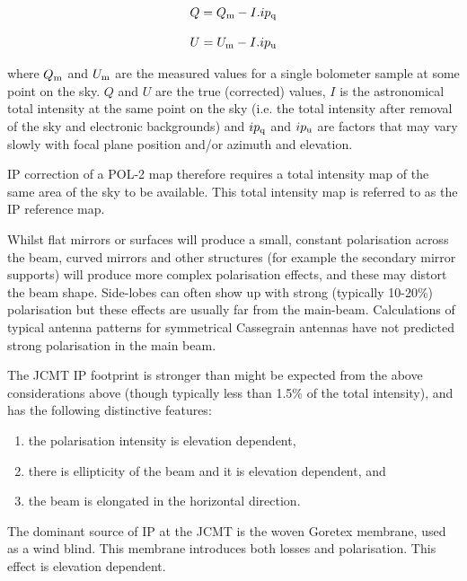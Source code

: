 \begin{equation}
Q = Q_{\textnormal{m}} - I. ip_{\textnormal{q}}
\end{equation}

\begin{equation}
U = U_{\textnormal{m}} - I. ip_{\textnormal{u}}
\end{equation}

where $Q_{\textnormal{m}}$ and $U_{\textnormal{m}}$ are the measured values for a single
bolometer sample at some point on the sky. $Q$ and $U$ are the true
(corrected) values, $I$ is the astronomical total intensity at the same
point on the sky (i.e. the total intensity after removal of the sky
and electronic backgrounds) and $ip_{\textnormal{q}}$ and $ip_{\textnormal{u}}$
are factors that may vary slowly with focal plane position and/or azimuth and
elevation.

IP correction of a POL-2 map therefore requires a total
intensity map of the same area of the sky to be available. This total
intensity map is referred to as the IP reference map.

Whilst flat mirrors or surfaces will produce a small, constant
polarisation across the beam, curved mirrors and other structures (for
example the secondary mirror supports) will produce more complex
polarisation effects, and these may distort the beam shape.
Side-lobes can often show up with strong (typically 10-20\%)
polarisation but these effects are usually far from the
main-beam. Calculations of typical antenna patterns for symmetrical
Cassegrain antennas have not predicted strong polarisation in the main
beam.

The JCMT IP footprint is stronger than might be expected from the
above considerations above (though typically less than 1.5\% of the
total intensity), and has the following distinctive features:

\begin{enumerate}
\item the polarisation intensity is elevation dependent,
\item there is ellipticity of the beam and it is elevation dependent, and
\item the beam is elongated in the horizontal direction.
\end{enumerate}

The dominant source of IP at the JCMT is the woven Goretex membrane,
used as a wind blind.  This membrane introduces both losses and
polarisation. This effect is elevation dependent.


